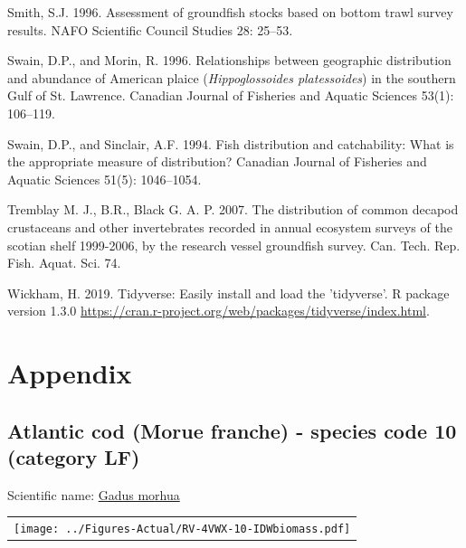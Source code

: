 \documentclass[12pt]{article}\usepackage[]{graphicx}\usepackage[]{color}
\begin{document}
\begin{CSLReferences}{1}{0}
\leavevmode\hypertarget{ref-Smith:1996}{}%
Smith, S.J. 1996. Assessment of groundfish stocks based on bottom trawl survey results. {NAFO} Scientific Council Studies 28: 25--53.

\leavevmode\hypertarget{ref-Swain:Morin:1996:cjfas}{}%
Swain, D.P., and Morin, R. 1996. Relationships between geographic distribution and abundance of {A}merican plaice (\emph{{H}ippoglossoides platessoides}) in the southern {G}ulf of {S}t. {L}awrence. Canadian Journal of Fisheries and Aquatic Sciences 53(1): 106--119.

\leavevmode\hypertarget{ref-Swain:Sinclair:1994:cjfas}{}%
Swain, D.P., and Sinclair, A.F. 1994. Fish distribution and catchability: {W}hat is the appropriate measure of distribution? Canadian Journal of Fisheries and Aquatic Sciences 51(5): 1046--1054.

\leavevmode\hypertarget{ref-Tremblayetal:2007}{}%
Tremblay M. J., B.R., Black G. A. P. 2007. The distribution of common decapod crustaceans and other invertebrates recorded in annual ecosystem surveys of the scotian shelf 1999-2006, by the research vessel groundfish survey. Can. Tech. Rep. Fish. Aquat. Sci. 74.

\leavevmode\hypertarget{ref-R:Tidyverse}{}%
Wickham, H. 2019. Tidyverse: Easily install and load the 'tidyverse'. R package version 1.3.0 \url{https://cran.r-project.org/web/packages/tidyverse/index.html}.

\end{CSLReferences}
\pagebreak

\hypertarget{appendix}{%
\section{Appendix}\label{appendix}}

\pagebreak 

\renewcommand\thefigure{\thesubsection\Alph{figure}}

\setcounter{figure}{0}

\hypertarget{sec:10}{%
\subsection{Atlantic cod (Morue franche) - species code 10 (category LF)}\label{sec:10}}

  


Scientific name: \href{http://www.marinespecies.org/aphia.php?p=taxdetails\&id=126436}{Gadus morhua} \newline
\begin{minipage}{1.0\textwidth}
 \begin{tabular}{c}
\texttt{[image: ../Figures-Actual/RV-4VWX-10-IDWbiomass.pdf]} \\ 
\end{tabular} 
\end{minipage}
\newline
\end{document}
